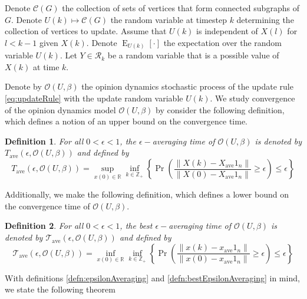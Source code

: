 \documentclass{amsart}
\DeclareMathOperator{\E}{E}
\newcommand{\R}[0]{\mathbb{R}}
\newtheorem{definition}{Definition}
\theoremstyle{remark}
\begin{document}
Denote $\mathcal{C}(G)$ the collection of sets of vertices that form connected subgraphs of $G$. Denote $U(k)\mapsto\mathcal{C}(G)$ the random variable at timestep $k$ determining the collection of vertices to update. Assume that $U(k)$ is independent of $X(l)$ for $l<k-1$ given $X(k)$. Denote $\E_{U(k)}[\cdot]$ the expectation over the random variable $U(k)$. Let $Y\in\mathcal{R}_k$ be a random variable that is a possible value of $X(k)$ at time $k$.

Denote by $\mathcal{O}(U,\beta)$ the opinion dynamics stochastic process of the update rule \eqref{eq:updateRule} with the update random variable $U(k)$. We study convergence of the opinion dynamics model $\mathcal{O}(U,\beta)$ by consider the following definition, which defines a notion of an upper bound on the convergence time.
    \begin{definition}{\label{defn:epsilonAveraging}}
	    For all $0<\epsilon<1$, the $\epsilon-$\textit{averaging time} of $\mathcal{O}(U,\beta)$ is denoted by $T_{\text{ave}}(\epsilon,\mathcal{O}(U,\beta))$ and defined by
    \begin{equation}
	    T_{\text{ave}}(\epsilon,\mathcal{O}(U,\beta)) = \sup_{x(0)\in\R}\inf_{k\in\mathbb{Z}_+}\left\{\Pr\left(\frac{\|X(k)-X_{\text{ave}}1_n\|}{\|X(0)-X_{\text{ave}}1_n\|}\geq\epsilon\right)\leq\epsilon\right\}
    \end{equation}
    \end{definition}
    Additionally, we make the following definition, which defines a lower bound on the convergence time of $\mathcal{O}(U,\beta)$.
    \begin{definition}{\label{defn:bestEpsilonAveraging}}
	    For all $0<\epsilon<1$, the \textit{best} $\epsilon-$\textit{averaging time} of $\mathcal{O}(U,\beta)$ is denoted by $\mathcal{T}_{\text{ave}}(\epsilon,\mathcal{O}(U,\beta))$ and defined by
    \begin{equation}
	    \mathcal{T}_{\text{ave}}(\epsilon,\mathcal{O}(U,\beta)) = \inf_{x(0)\in\R}\inf_{k\in\mathbb{Z}_+}\left\{\Pr\left(\frac{\|x(k)-x_{\text{ave}}1_n\|}{\|x(0)-x_{\text{ave}}1_n\|}\geq\epsilon\right)\leq\epsilon\right\}
    \end{equation}
    \end{definition}
    With definitions \ref{defn:epsilonAveraging} and \ref{defn:bestEpsilonAveraging} in mind, we state the following theorem
\end{document}
